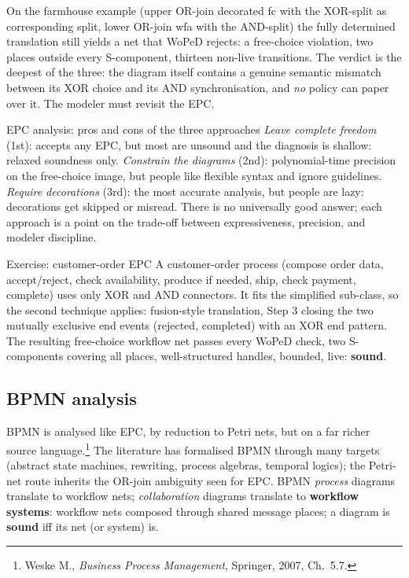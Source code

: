 On the farmhouse example (upper OR-join decorated \textsf{fc} with the XOR-split as corresponding split, lower OR-join \textsf{wfa} with the AND-split) the fully determined translation still yields a net that WoPeD rejects: a free-choice violation, two places outside every S-component, thirteen non-live transitions. The verdict is the deepest of the three: the diagram itself contains a genuine semantic mismatch between its XOR choice and its AND synchronisation, and \emph{no} policy can paper over it. The modeler must revisit the EPC.

\begin{notebox}{EPC analysis: pros and cons of the three approaches}
\emph{Leave complete freedom} (1st): accepts any EPC, but most are unsound and the diagnosis is shallow: relaxed soundness only. \emph{Constrain the diagrams} (2nd): polynomial-time precision on the free-choice image, but people like flexible syntax and ignore guidelines. \emph{Require decorations} (3rd): the most accurate analysis, but people are lazy: decorations get skipped or misread. There is no universally good answer; each approach is a point on the trade-off between expressiveness, precision, and modeler discipline.
\end{notebox}

\begin{examplebox}{Exercise: customer-order EPC}
A customer-order process (compose order data, accept/reject, check availability, produce if needed, ship, check payment, complete) uses only XOR and AND connectors. It fits the simplified sub-class, so the second technique applies: fusion-style translation, Step 3 closing the two mutually exclusive end events (\textsf{rejected}, \textsf{completed}) with an XOR end pattern. The resulting free-choice workflow net passes every WoPeD check, two S-components covering all places, well-structured handles, bounded, live: \textbf{sound}.
\end{examplebox}

\subsection{BPMN analysis}

BPMN is analysed like EPC, by reduction to Petri nets, but on a far richer source language.\footnote{Weske M., \emph{Business Process Management}, Springer, 2007, Ch.~5.7.} The literature has formalised BPMN through many targets (abstract state machines, rewriting, process algebras, temporal logics); the Petri-net route inherits the OR-join ambiguity seen for EPC. BPMN \emph{process} diagrams translate to workflow nets; \emph{collaboration} diagrams translate to \textbf{workflow systems}: workflow nets composed through shared message places; a diagram is \textbf{sound} iff its net (or system) is.

